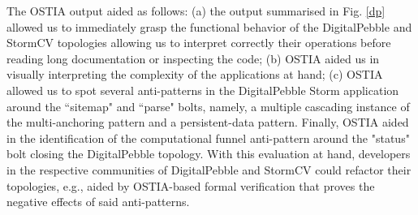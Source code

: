 
The OSTIA output aided as follows: (a) the output summarised in Fig. \ref{dp}
allowed us to immediately grasp the functional behavior of the DigitalPebble and
StormCV topologies allowing us to interpret correctly their operations before
reading long documentation or inspecting the code; (b) OSTIA aided us in visually interpreting the complexity of the applications at hand; (c) OSTIA allowed us to spot several anti-patterns in the DigitalPebble Storm application around the ``sitemap" and ``parse" bolts, namely, a multiple cascading instance of the multi-anchoring pattern and a persistent-data pattern. Finally, OSTIA aided in the identification of the computational funnel anti-pattern around the "status" bolt closing the DigitalPebble topology. With this evaluation at hand, developers in the respective communities of DigitalPebble and StormCV could refactor their topologies, e.g., aided by OSTIA-based formal verification that proves the negative effects of said anti-patterns.
%
